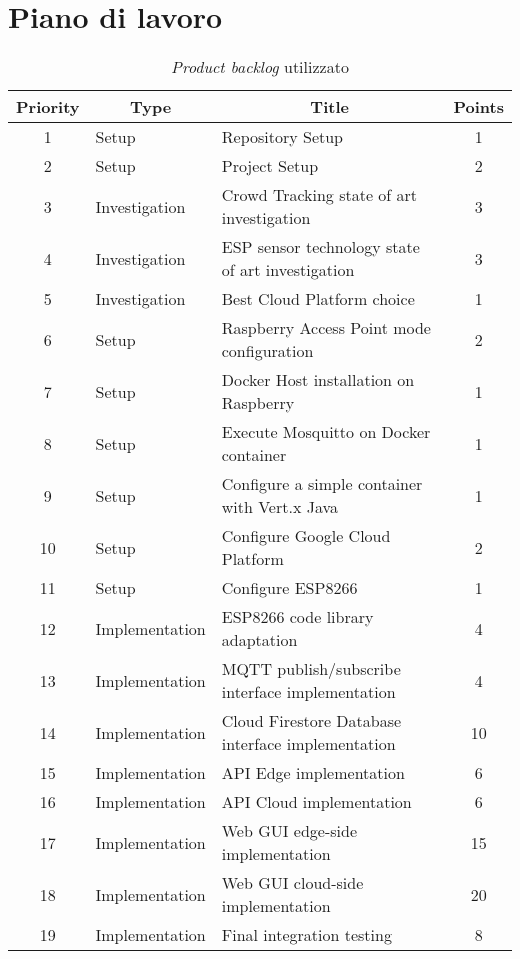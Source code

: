 \section{Piano di lavoro}

\begin{table}[H]
  \begin{tabularx}{\textwidth}{|c|l|X|c|}
    \hline
    \textbf{Priority} & \multicolumn{1}{c|}{\textbf{Type}} & \multicolumn{1}{c|}{\textbf{Title}} & \textbf{Points} \\ \hline
    1 & Setup & Repository Setup & 1 \\ \hline
    2 & Setup & Project Setup & 2 \\ \hline
    3 & Investigation & Crowd Tracking state of art investigation & 3 \\ \hline
    4 & Investigation & ESP sensor technology state of art investigation & 3 \\ \hline
    5 & Investigation & Best Cloud Platform choice & 1 \\ \hline
    6 & Setup & Raspberry Access Point mode configuration & 2 \\ \hline
    7 & Setup & Docker Host installation on Raspberry & 1 \\ \hline
    8 & Setup & Execute Mosquitto on Docker container & 1 \\ \hline
    9 & Setup & Configure a simple container with Vert.x Java & 1 \\ \hline
    10 & Setup & Configure Google Cloud Platform & 2 \\ \hline
    11 & Setup & Configure ESP8266 & 1 \\ \hline
    12 & Implementation & ESP8266 code library adaptation & 4 \\ \hline
    13 & Implementation & MQTT publish/subscribe interface implementation & 4 \\ \hline
    14 & Implementation & Cloud Firestore Database interface implementation & 10 \\ \hline
    15 & Implementation & API Edge implementation & 6 \\ \hline
    16 & Implementation & API Cloud implementation & 6 \\ \hline
    17 & Implementation & Web GUI edge-side implementation & 15 \\ \hline
    18 & Implementation & Web GUI cloud-side implementation & 20 \\ \hline
    19 & Implementation & Final integration testing & 8 \\ \hline
  \end{tabularx}
  \caption{\emph{Product backlog} utilizzato}%
  \label{tab:backlog}
\end{table}

